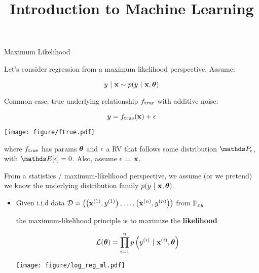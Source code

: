 \documentclass[11pt,compress,t,notes=noshow, xcolor=table]{beamer}
\title{Introduction to Machine Learning}
\begin{document}
    

\begin{vbframe}{Maximum Likelihood}

Let's consider regression from a maximum likelihood perspective. Assume: 

$$
	y~|~ \mathbf{x} \sim p(y~|~\mathbf{x}, \bm{\theta})
$$

\vspace{0.5cm}

Common case: 
true underlying relationship $f_{\text{true}}$ with additive noise: 

\vspace{0.5cm}

\begin{minipage}{0.5\textwidth}
$$
y = f_{\text{true}}(\mathbf{x}) + \epsilon
$$
\end{minipage}%
\begin{minipage}{0.5\textwidth}
\texttt{[image: figure/ftrue.pdf]}
\end{minipage}

where $f_{\text{true}}$ has params $\bm{\theta}$ and $\epsilon$ a RV that follows some distribution $\P_\eps$, with $\E[\eps] = 0$. Also, assume $\epsilon \perp \!\!\! \perp \mathbf{x}$.


\framebreak 

From a statistics / maximum-likelihood perspective, we assume (or we pretend) we know the underlying distribution family $p(y~|~\mathbf{x}, \bm{\theta})$.

\begin{itemize}
\item Given i.i.d data $
\mathcal{D} = \left( \left(\mathbf{x}^{(1)}, y^{(1)}\right), \ldots, \left(\mathbf{x}^{(n)}, y^{(n)}\right)\right)
$
 from $\mathbb{P}_{xy}$ 

the maximum-likelihood principle is to maximize the \textbf{likelihood}

\begin{minipage}{0.5\textwidth}
$$ \mathcal{L}(\bm{\theta}) = \prod_{i=1}^n p\left(y^{(i)} ~|~\mathbf{x}^{(i)}, \bm{\theta}\right) $$
\end{minipage}%
\begin{minipage}{0.5\textwidth}
\texttt{[image: figure/log\_reg\_ml.pdf]}
\end{minipage}


\end{itemize}
\end{vbframe}
\end{document}

